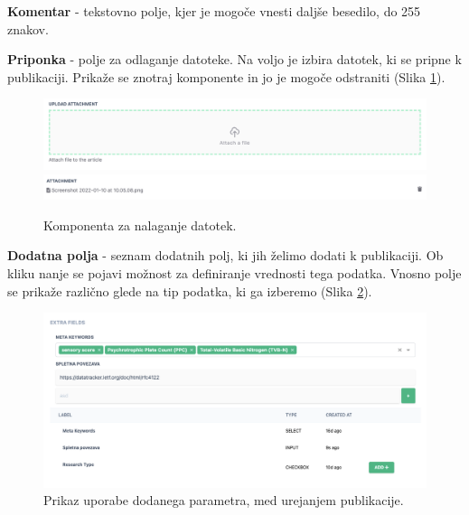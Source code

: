 \begin{description}
\item \textbf{Komentar} - tekstovno polje, kjer je mogoče vnesti daljše besedilo, do 255 znakov.

\item \textbf{Priponka} - polje za odlaganje datoteke. Na voljo je izbira datotek, ki se pripne k publikaciji. Prikaže se znotraj komponente in jo je mogoče odstraniti (Slika  \ref{type-fileupload}).

\begin{figure}[h]
\begin{center}
\includegraphics[width=1\textwidth]{slike/upload_file_zone.png}
\includegraphics[width=1\textwidth]{slike/upload_file_list.png}
\end{center}
\caption{ Komponenta za nalaganje datotek. }
\label{type-fileupload}
\end{figure}

\item \textbf{Dodatna polja} - seznam dodatnih polj, ki jih želimo dodati k publikaciji. Ob kliku nanje se pojavi možnost za definiranje vrednosti tega podatka. Vnosno polje se prikaže različno glede na tip podatka, ki ga izberemo (Slika \ref{fields-usage}).
\begin{figure}[h]
\begin{center}
\includegraphics[width=1\textwidth]{slike/fields_usage.png}
\end{center}
\caption{ Prikaz uporabe dodanega parametra, med urejanjem publikacije. }
\label{fields-usage}
\end{figure}

\end{description}


